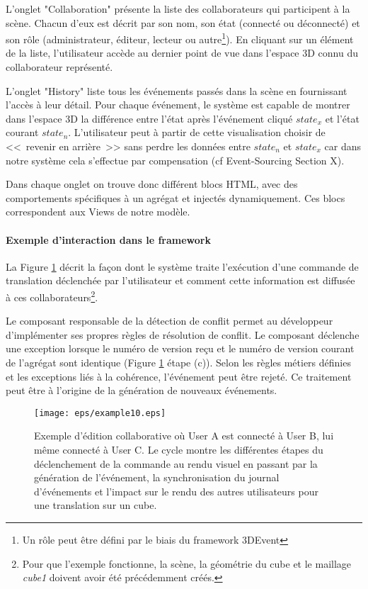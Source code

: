 L'onglet "Collaboration" présente la liste des collaborateurs qui participent à la 
scène. Chacun d'eux est décrit par son nom, son état  (connecté ou déconnecté) 
et son rôle (administrateur, éditeur, lecteur ou autre\footnote{Un rôle peut être 
	défini par le biais du \gls{framework} 3DEvent}). En cliquant sur un élément de 
	la 
liste, l'utilisateur accède au dernier point de vue dans l'espace \gls{3D} connu du 
collaborateur représenté.

L'onglet "History" liste tous les événements passés dans la scène en fournissant 
l'accès à leur détail. Pour chaque événement, le système est capable de montrer 
dans l'espace \gls{3D} la différence entre l'état  après l'événement cliqué $state_x$ 
et 
l'état courant $state_n$. L'utilisateur peut à partir de cette visualisation choisir de 
<<~revenir en arrière~>> sans perdre les données entre $state_n$ et $state_x$ 
car dans notre système cela s'effectue par compensation (cf Event-Sourcing 
Section X).

Dans chaque onglet on trouve donc différent blocs \gls{HTML}, avec des 
comportements spécifiques à un agrégat et injectés dynamiquement. Ces blocs 
correspondent aux Views de notre modèle.
\paragraph{Exemple d'interaction dans le framework}
La Figure \ref{fig:cqrs-example} décrit la façon dont le système traite l'exécution 
d'une commande de translation déclenchée par l'utilisateur et comment cette 
information est diffusée à ces collaborateurs\footnote{Pour que l'exemple 
fonctionne, la scène, 
la géométrie du cube et le maillage \textit{cube1} doivent avoir été précédemment 
créés.}. 


Le composant responsable de la détection de conflit permet au développeur 
d'implémenter ses propres règles de résolution de conflit. Le composant déclenche 
une exception lorsque le numéro de version reçu et le numéro de version courant 
de l'agrégat sont identique (Figure \ref{fig:cqrs-example} étape (c)). Selon les 
règles métiers définies et les exceptions liés à la cohérence, l'événement peut être 
rejeté. Ce traitement peut être à l'origine de la génération de nouveaux 
événements.


\begin{figure}[]
	\centering
	\texttt{[image: eps/example10.eps]}
	\caption[Flux de la collaboration dans le framework 3DEvent entre 3 
	utilisateurs]{Exemple d'édition collaborative où User A est connecté à User  B, 
		lui 
		même connecté à User C. Le cycle montre les différentes étapes du 
		déclenchement de la commande au rendu visuel en passant par la 
		génération 
		de l'événement, la 
		synchronisation du journal d'événements et l'impact sur le rendu des autres 
		utilisateurs pour une translation sur un cube.}\label{fig:cqrs-example}
\end{figure}
